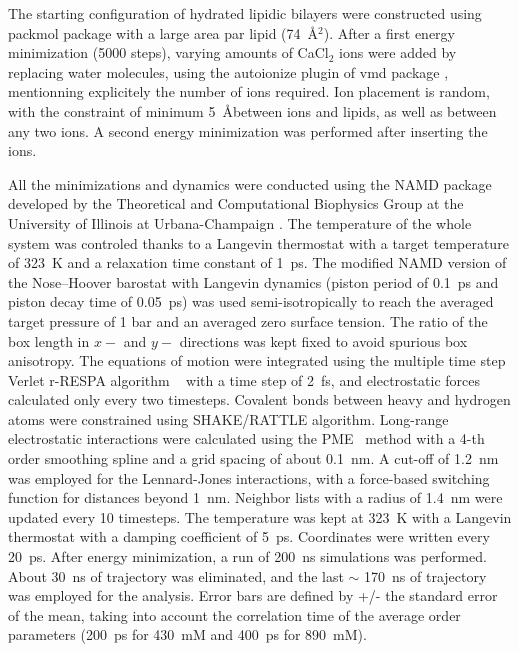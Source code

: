 \documentclass[pre,aps,floatfix,authordate1-4,twocolumn]{revtex4-1}
\begin{document}
The starting  configuration of hydrated lipidic bilayers were constructed using packmol 
package \cite{packmol} with a large area par lipid (74~\AA$^{2}$). 
After a first energy minimization (5000 steps),
varying amounts of CaCl$_2$ ions were added  by replacing water molecules,
using the autoionize plugin of vmd package \cite{hump96},
mentionning explicitely the number of ions required.
Ion placement is random, with the constraint of  minimum 5~\AA between ions and lipids,
as well as between any two ions. A second energy minimization was performed after inserting the ions.

All the minimizations and dynamics were conducted using the NAMD package developed 
by the Theoretical and Computational Biophysics Group at the University of Illinois at Urbana-Champaign \cite{NAMD}.
The temperature of the whole system was controled thanks to a Langevin  thermostat with a target temperature of 323~K 
and a relaxation time constant of 1~ps.  The modified NAMD version of the Nose–Hoover barostat with Langevin dynamics
(piston period of 0.1~ps and piston decay time of 0.05~ps) was used semi-isotropically
to reach the averaged target pressure of 1 bar and an averaged zero surface tension. 
The ratio of the box length in $x-$ and $y-$ directions was kept fixed to avoid spurious box anisotropy.
The equations of motion were integrated using the multiple time step Verlet r-RESPA algorithm ~\cite{pall13}
with a time step of 2~fs, and electrostatic forces calculated only every two timesteps. Covalent
bonds between heavy and hydrogen atoms were constrained using SHAKE/RATTLE algorithm.
Long-range electrostatic interactions were calculated using the PME~\cite{darden93,essman95} method 
with a 4-th order smoothing spline and a grid spacing of about 0.1~nm.
 A cut-off of 1.2~nm was employed for the Lennard-Jones
interactions, with a force-based switching function for distances beyond 1~nm. Neighbor
lists with a radius of 1.4~nm were updated every 10 timesteps.
The temperature was kept at 323~K with a Langevin thermostat with a damping coefficient of 5~ps.  Coordinates were written every 20~ps.
After energy minimization, a run of  200~ns simulations was performed. 
About 30~ns of trajectory was eliminated, and the last $\sim$ 170~ns of  trajectory was employed for the analysis.
Error bars are defined by +/- the standard error of the mean, 
taking into account the correlation time of the average order parameters 
(200~ps for 430~mM and 400~ps for 890~mM). 
\end{document}
